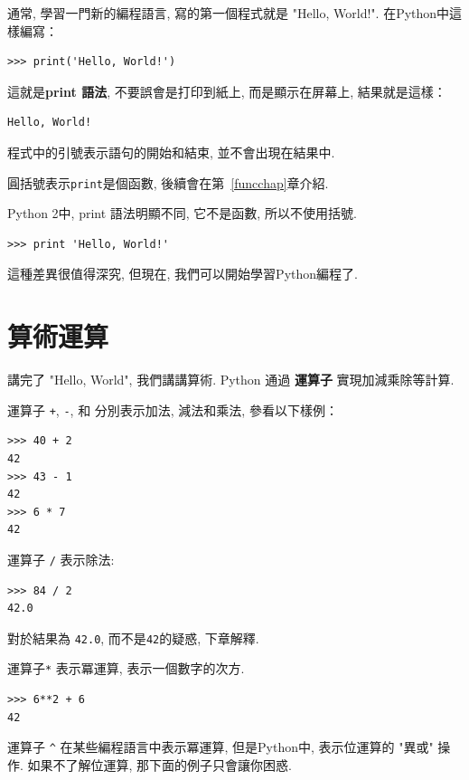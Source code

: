 \documentclass[10pt]{book}
\begin{document}
通常, 學習一門新的編程語言, 寫的第一個程式就是 "Hello, World!". 
在Python中這樣編寫：

\begin{verbatim}
>>> print('Hello, World!')
\end{verbatim}
%

這就是{\bf print 語法}, 不要誤會是打印到紙上, 而是顯示在屏幕上, 
結果就是這樣：

\begin{verbatim}
Hello, World!
\end{verbatim}
%

程式中的引號表示語句的開始和結束, 並不會出現在結果中. 

圓括號表示{\tt print}是個函數, 後續會在第~\ref{funcchap}章介紹. 
 

Python 2中, print 語法明顯不同, 它不是函數, 所以不使用括號. 

\begin{verbatim}
>>> print 'Hello, World!'
\end{verbatim}
%
這種差異很值得深究, 
但現在, 我們可以開始學習Python編程了. 


\section{算術運算}

講完了 "Hello, World", 我們講講算術. Python 通過 {\bf 運算子} 
實現加減乘除等計算. 

運算子 {\tt +}, {\tt -}, 和 {\tt *} 分別表示加法, 減法和乘法, 參看以下樣例：

\begin{verbatim}
>>> 40 + 2
42
>>> 43 - 1
42
>>> 6 * 7
42
\end{verbatim}
%
運算子 {\tt /} 表示除法:

\begin{verbatim}
>>> 84 / 2
42.0
\end{verbatim}
%

對於結果為 {\tt 42.0}, 而不是{\tt 42}的疑惑, 下章解釋. 

運算子{\tt **} 表示冪運算, 表示一個數字的次方. 

\begin{verbatim}
>>> 6**2 + 6
42
\end{verbatim}
%

運算子 \verb"^" 在某些編程語言中表示冪運算, 但是Python中, 
表示位運算的 "異或" 操作. 如果不了解位運算, 那下面的例子只會讓你困惑. 
\end{document}

